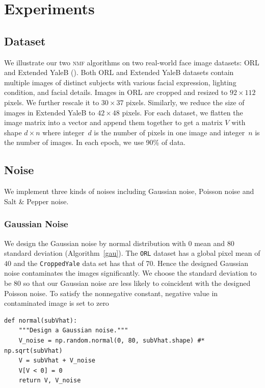 \section{Experiments}\label{chapter4}

\subsection{Dataset}
We illustrate our two \textsc{nmf} algorithms on two real-world face image datasets: ORL and Extended YaleB (\citet{belhumeur1997eigenfaces}).
Both ORL and Extended YaleB datasets contain multiple images of distinct subjects with various facial expression, lighting condition, and facial details.
Images in ORL are cropped and resized to $92 \times 112$ pixels. We further rescale it to $30 \times 37$ pixels. Similarly, we reduce the size of images in Extended YaleB to $42 \times 48$ pixels.
For each dataset, we flatten the image matrix into a vector and append them together to get a matrix $V$ with shape $d\times n$ where integer~$d$ is the number of pixels in one image and integer~$n$ is the number of images. In each epoch, we use 90\% of data.

\subsection{Noise}
We implement three kinds of noises including Gaussian noise, Poisson noise and Salt \& Pepper noise.
\subsubsection{Gaussian Noise}\label{sec:gau}
We design the Gaussian noise by normal distribution with $0$ mean and $80$ standard deviation (Algorithm~\ref{gau}). The \texttt{ORL} dataset has a global pixel mean of $40$ and the \texttt{CroppedYale} data set has that of $70$. Hence the designed Gaussian noise contaminates the images significantly. We choose the standard deviation to be $80$ so that our Gaussian noise are less likely to coincident with the designed Poisson noise. To satisfy the nonnegative constant, negative value in contaminated image is set to zero
\begin{lstlisting}[caption= Gaussian Noise Design, label=gau]
def normal(subVhat):
    """Design a Gaussian noise."""
    V_noise = np.random.normal(0, 80, subVhat.shape) #* np.sqrt(subVhat)
    V = subVhat + V_noise
    V[V < 0] = 0
    return V, V_noise
\end{lstlisting}


